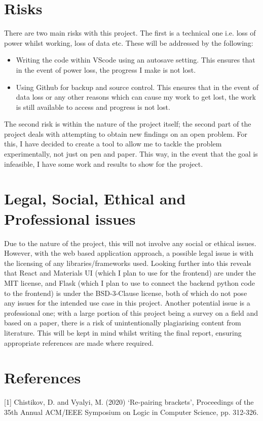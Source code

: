 \documentclass[a4paper]{article}
\begin{document}
\section{Risks}
There are two main risks with this project. The first is a technical one i.e. loss of power whilst working, loss of data etc. These will be addressed by the following:
\begin{itemize}
	\item Writing the code within VScode using an autosave setting. This ensures that in the event of power loss, the progress I make is not lost.
	\item Using Github for backup and source control. This ensures that in the event of data loss or any other reasons which can cause my work to get lost, the work is still available to access and progress is not lost.
\end{itemize}
The second risk is within the nature of the project itself; the second part of the project deals with attempting to obtain new findings on an open problem. For this, I have decided to create a tool to allow me to tackle the problem experimentally, not just on pen and paper. This way, in the event that the goal is infeasible, I have some work and results to show for the project.

\section{Legal, Social, Ethical and Professional issues}
Due to the nature of the project, this will not involve any social or ethical issues. 
\newline
\newline
However, with the web based application approach, a possible legal issue is with the licensing of any libraries/frameworks used. Looking further into this reveals that React and Materials UI (which I plan to use for the frontend) are under the MIT license, and Flask (which I plan to use to connect the backend python code to the frontend) is under the BSD-3-Clause license, both of which do not pose any issues for the intended use case in this project. 
\newline
\newline
Another potential issue is a professional one; with a large portion of this project being a survey on a field and based on a paper, there is a risk of unintentionally plagiarising content from literature. This will be kept in mind whilst writing the final report, ensuring appropriate references are made where required.
\section*{References}
[1] Chistikov, D. and Vyalyi, M. (2020) `Re-pairing brackets', Proceedings of the 35th Annual ACM/IEEE Symposium on Logic in Computer Science, pp. 312-326.
\end{document}
